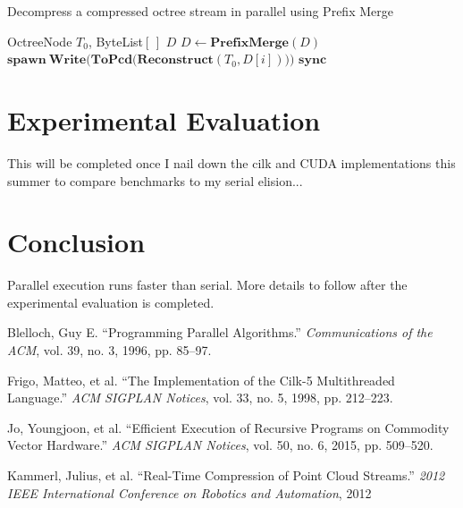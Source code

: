 \documentclass[twoside,twocolumn]{article}
\begin{document}
\begin{algorithm}[h]
\small
\caption{Decompress a compressed octree stream in parallel using Prefix Merge}
\label{alg:ParDecomp}
\begin{algorithmic}[1]
 {OctreeNode $T_0$, ByteList$[\,]$ $D$}
  \State $D \gets \mathbf{PrefixMerge}(D)$
    \State $\mathbf{spawn \ Write(ToPcd(Reconstruct}(T_0, D[i])))$
  \EndFor
  \State $\mathbf{sync}$
\EndProcedure
\Statex
\end{algorithmic}
\vspace{-0.4cm}
\end{algorithm}


\section{Experimental Evaluation} \label{sec:Experimental Evaluation}

This will be completed once I nail down the cilk \cite{cilk} and CUDA implementations this summer to
compare benchmarks to my serial elision...


\section{Conclusion} \label{sec:Conclusion}

Parallel execution runs faster than serial. More details to follow after the experimental evaluation
is completed.


\begin{thebibliography}{15}


Blelloch, Guy E. “Programming Parallel Algorithms.”
\textit{Communications of the ACM}, vol. 39, no. 3, 1996, pp. 85–97.

Frigo, Matteo, et al. “The Implementation of the Cilk-5 Multithreaded Language.”
\textit{ACM SIGPLAN Notices}, vol. 33, no. 5, 1998, pp. 212–223.

Jo, Youngjoon, et al. “Efficient Execution of Recursive Programs on Commodity Vector Hardware.”
\textit{ACM SIGPLAN Notices}, vol. 50, no. 6, 2015, pp. 509–520.

Kammerl, Julius, et al. “Real-Time Compression of Point Cloud Streams.”
\textit{2012 IEEE International Conference on Robotics and Automation}, 2012
 
\end{thebibliography}

\end{document}
